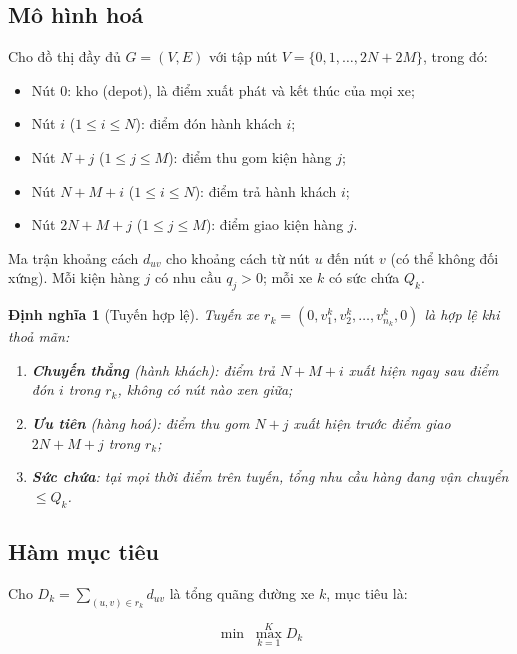 \documentclass[12pt, a4paper]{article}
\newtheorem{definition}{Định nghĩa}[section]
\begin{document}
\subsection{Mô hình hoá}

Cho đồ thị đầy đủ $G = (V, E)$ với tập nút $V = \{0, 1, \ldots, 2N+2M\}$, trong đó:

\begin{itemize}[noitemsep]
  \item Nút $0$: kho (depot), là điểm xuất phát và kết thúc của mọi xe;
  \item Nút $i$ ($1 \leq i \leq N$): điểm đón hành khách $i$;
  \item Nút $N+j$ ($1 \leq j \leq M$): điểm thu gom kiện hàng $j$;
  \item Nút $N+M+i$ ($1 \leq i \leq N$): điểm trả hành khách $i$;
  \item Nút $2N+M+j$ ($1 \leq j \leq M$): điểm giao kiện hàng $j$.
\end{itemize}

Ma trận khoảng cách $d_{uv}$ cho khoảng cách từ nút $u$ đến nút $v$ (có thể không đối xứng). Mỗi kiện hàng $j$ có nhu cầu $q_j > 0$; mỗi xe $k$ có sức chứa $Q_k$.

\begin{definition}[Tuyến hợp lệ]
  Tuyến xe $r_k = (0, v_1^k, v_2^k, \ldots, v_{n_k}^k, 0)$ là \emph{hợp lệ} khi thoả mãn:
  \begin{enumerate}
    \item \textbf{Chuyến thẳng} (hành khách): điểm trả $N+M+i$ xuất hiện ngay sau điểm đón $i$ trong $r_k$, không có nút nào xen giữa;
    \item \textbf{Ưu tiên} (hàng hoá): điểm thu gom $N+j$ xuất hiện trước điểm giao $2N+M+j$ trong $r_k$;
    \item \textbf{Sức chứa}: tại mọi thời điểm trên tuyến, tổng nhu cầu hàng đang vận chuyển $\leq Q_k$.
  \end{enumerate}
\end{definition}

\subsection{Hàm mục tiêu}

Cho $D_k = \sum_{(u,v) \in r_k} d_{uv}$ là tổng quãng đường xe $k$, mục tiêu là:

\begin{equation}
  \min \; \max_{k=1}^{K} D_k
  \label{eq:objective}
\end{equation}
\end{document}
